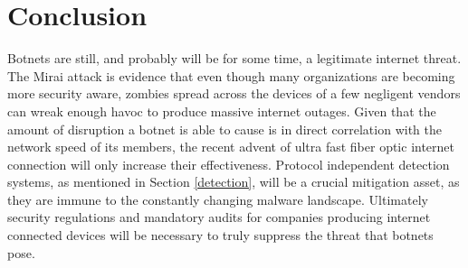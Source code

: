 \section{Conclusion}
Botnets are still, and probably will be for some time, a legitimate internet threat.
The Mirai attack is evidence that even though many organizations are becoming more
security aware, zombies spread across the devices of a few negligent vendors can
wreak enough havoc to produce massive internet outages.
Given that the amount of disruption a botnet is able to cause is in direct
correlation with the network speed of its members, the recent advent of ultra fast fiber
optic internet connection will only increase their effectiveness. Protocol
independent detection systems, as mentioned in Section \ref{detection},
will be a crucial mitigation asset, as they are immune to the constantly changing 
malware landscape.  Ultimately security regulations and mandatory audits
for companies producing internet connected devices will be necessary to truly
suppress the threat that botnets pose. 

